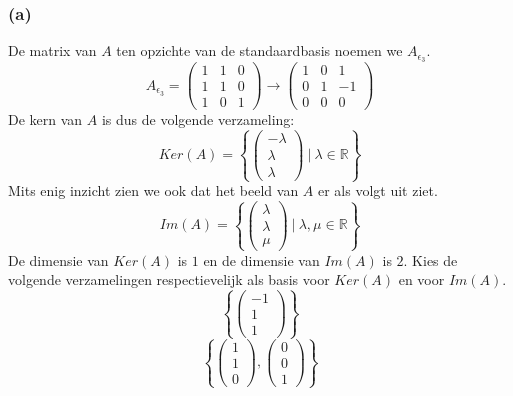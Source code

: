 \documentclass[lineaire_algebra_oplossingen.tex]{subfiles}
\begin{document}
\subsubsection*{(a)}
De matrix van $A$ ten opzichte van de standaardbasis noemen we $A_{\epsilon_3}$.
\[
A_{\epsilon_3}=
\begin{pmatrix}
1 & 1 & 0\\
1 & 1 & 0\\
1 & 0 & 1
\end{pmatrix}
\rightarrow
\begin{pmatrix}
1 & 0 & 1\\
0 & 1 & -1\\
0 & 0 & 0
\end{pmatrix}
\]
De kern van $A$ is dus de volgende verzameling:
\[
Ker(A) = 
\left\{
\begin{pmatrix}
-\lambda\\\lambda\\\lambda
\end{pmatrix}
\ |\ \lambda\in\mathbb{R}
\right\}
\]
Mits enig inzicht zien we ook dat het beeld van $A$ er als volgt uit ziet.
\[
Im(A) = 
\left\{
\begin{pmatrix}
\lambda\\\lambda\\\mu
\end{pmatrix}
\ |\ \lambda,\mu\in\mathbb{R}
\right\}
\]
De dimensie van $Ker(A)$ is $1$ en de dimensie van $Im(A)$ is $2$.
Kies de volgende verzamelingen respectievelijk als basis voor $Ker(A)$ en voor $Im(A)$.
\[
\left\{
\begin{pmatrix}
-1\\1\\1
\end{pmatrix}
\right\}
\]
\[
\left\{
\begin{pmatrix}
1\\1\\0
\end{pmatrix}
,
\begin{pmatrix}
0\\0\\1
\end{pmatrix}
\right\}
\]
\end{document}
